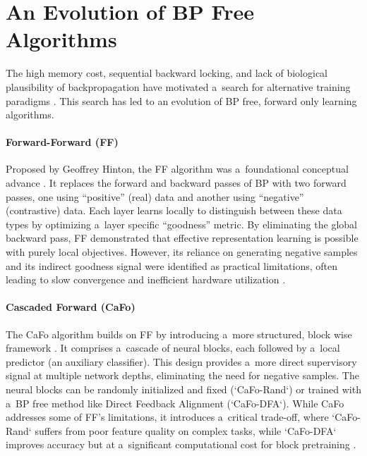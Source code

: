 \documentclass[letterpaper]{article}
\begin{document}
\section{An Evolution of BP Free Algorithms}

The high memory cost, sequential backward locking, and lack of biological plausibility of backpropagation have motivated a~search for alternative training paradigms \cite{lillicrap2020backpropagation, jaderberg2017decoupled}. This search has led to an evolution of BP free, forward only learning algorithms.

\paragraph{Forward-Forward (FF)}
Proposed by Geoffrey Hinton, the FF algorithm was a~foundational conceptual advance \cite{hinton2022forward}. It replaces the forward and backward passes of BP with two forward passes, one using ``positive'' (real) data and another using ``negative'' (contrastive) data. Each layer learns locally to distinguish between these data types by optimizing a~layer specific ``goodness'' metric. By eliminating the global backward pass, FF demonstrated that effective representation learning is possible with purely local objectives. However, its reliance on generating negative samples and its indirect goodness signal were identified as practical limitations, often leading to slow convergence and inefficient hardware utilization \cite{hinton2022forward, zhao2023cafo}.

\paragraph{Cascaded Forward (CaFo)}
The CaFo algorithm builds on FF by introducing a~more structured, block wise framework \cite{zhao2023cafo}. It comprises a~cascade of neural blocks, each followed by a~local predictor (an auxiliary classifier). This design provides a~more direct supervisory signal at multiple network depths, eliminating the need for negative samples. The neural blocks can be randomly initialized and fixed (`CaFo-Rand`) or trained with a~BP free method like Direct Feedback Alignment (`CaFo-DFA`). While CaFo addresses some of FF's limitations, it introduces a~critical trade-off, where `CaFo-Rand` suffers from poor feature quality on complex tasks, while `CaFo-DFA` improves accuracy but at a~significant computational cost for block pretraining \cite{zhao2023cafo}.
\end{document}
